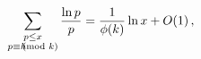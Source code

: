 \[\sum_{\begin{subarray}{c}p\leq x\\
p\equiv h\!\!\!\!\!\pmod{k}\end{subarray}}\frac{\mathop{\ln\/}\nolimits p}{p}=%
\frac{1}{\mathop{\phi\/}\nolimits\!\left(k\right)}\mathop{\ln\/}\nolimits x+%
\mathop{O\/}\nolimits\!\left(1\right),\]